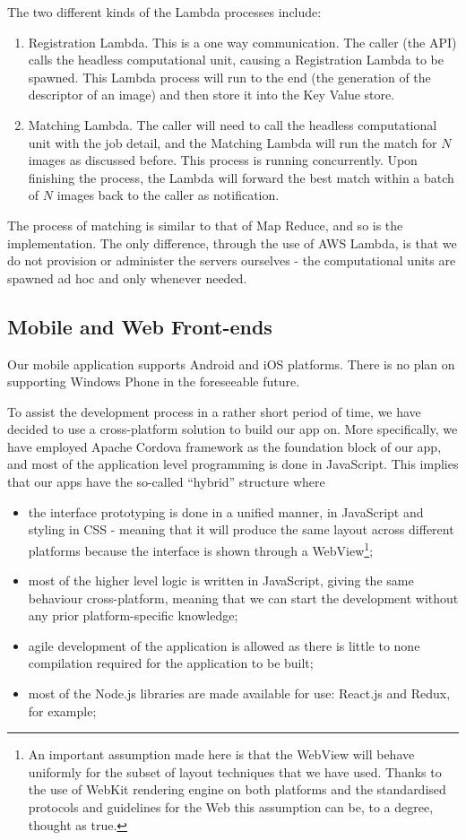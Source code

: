 The two different kinds of the Lambda processes include:

\begin{enumerate}
	\item Registration Lambda. This is a one way communication. The caller (the API) calls the headless computational unit, causing a Registration Lambda to be spawned. This Lambda process will run to the end (the generation of the descriptor of an image) and then store it into the Key Value store.
	\item Matching Lambda. The caller will need to call the headless computational unit with the job detail, and the Matching Lambda will run the match for $N$ images as discussed before. This process is running concurrently. Upon finishing the process, the Lambda will forward the best match within a batch of $N$ images back to the caller as notification.
\end{enumerate}

The process of matching is similar to that of Map Reduce, and so is the implementation. The only difference, through the use of AWS Lambda, is that we do not provision or administer the servers ourselves - the computational units are spawned ad hoc and only whenever needed.


\subsection{Mobile and Web Front-ends}
Our mobile application supports Android and iOS platforms. There is no plan on supporting Windows Phone in the foreseeable future.

To assist the development process in a rather short period of time, we have decided to use a cross-platform solution to build our app on. More specifically, we have employed Apache Cordova \cite{cordova} framework as the foundation block of our app, and most of the application level programming is done in JavaScript. This implies that our apps have the so-called ``hybrid'' structure where

\begin{itemize}
	\item the interface prototyping is done in a unified manner, in JavaScript and styling in CSS - meaning that it will produce the same layout across different platforms because the interface is shown through a WebView\footnote{An important assumption made here is that the WebView will behave uniformly for the subset of layout techniques that we have used. Thanks to the use of WebKit rendering engine on both platforms and the standardised protocols and guidelines for the Web this assumption can be, to a degree, thought as true.};
	\item most of the higher level logic is written in JavaScript, giving the same behaviour cross-platform, meaning that we can start the development without any prior platform-specific knowledge;
	\item agile development of the application is allowed as there is little to none compilation required for the application to be built;
	\item most of the Node.js libraries are made available for use: React.js and Redux, for example;
\end{itemize}

